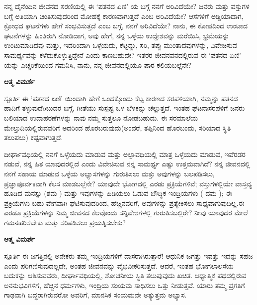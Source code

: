 \newpage
\begin{mananam}{}
\small \mananatext ನನ್ನ ದೈನೆಂದಿನ ಜೀವನದ ಸರಣಿಯಲ್ಲಿ ಈ ‘ಪತನದ ಏಣಿ’ ಯ  ಬಗ್ಗೆ ನನಗೆ ಅರಿವಿದೆಯೇ? ಜನರು ಮತ್ತು ವಸ್ತುಗಳ ಬಗ್ಗೆ ಅತಿಯಾಗಿ ಚಿಂತಿಸುವುದರಿಂದ ಮೋಹಕ್ಕೆ ಕಾರಣವಾಗುತ್ತದೆ ಎಂಬ ಅರಿವಿದೆಯೇ? ಆಸೆಗಳಿಗೆ  ಅಡ್ಡಿಯಾದಾಗ, ಕ್ರೋಧದ ಘಟನೆಗಳು ಹೇಗೆ ಸಂಭವಿಸುತ್ತದೆ ಎಂಬ ಬಗ್ಗೆ, ನನಗೆ ಅರಿವಿದೆಯೇ? ನಾನು, ಈ ಕೋಪದಿಂದ ಉಂಟಾದ ಘಟನೆಗಳನ್ನು ಹಿಂತಿರುಗಿ ನೋಡಿದಾಗ,  ಅವು ಹೇಗೆ, ನನ್ನ ಒಳ್ಳೆಯ ಉದ್ದೇಶವನ್ನು ಮರೆಯಿಸಿ,  ಭ್ರಮೆಯನ್ನು ಉಂಟುಮಾಡಿದವು ಮತ್ತು,  ಇದರಿಂದಾಗಿ ಒಳ್ಳೆಯದು, ಕೆಟ್ಟದ್ದು, ಸರಿ, ತಪ್ಪು ಮುಂತಾದವುಗಳನ್ನು, ವಿವೇಚಿಸುವ ಸಾಮರ್ಥ್ಯವನ್ನು ಕಳೆದುಕೊಳ್ಳುತ್ತಿದ್ದೇನೆ ಎಂದು ಕಾಣಬಹುದೇ?  ಇತರರ ಜೀವನವನದಲ್ಲಿರುವ ಈ ‘ಪತನದ ಏಣಿ’ ಯನ್ನು ಎಚ್ಚರಿಕೆಯಿಂದ ಗಮನಿಸಿ, ನಾನು, ನನ್ನ ಜೀವನದಲ್ಲಿಯೂ ಪಾಠ ಕಲಿಯಬಲ್ಲೆನೇ?
\end{mananam}
\WritingHand\enspace\textbf{ಆತ್ಮ ವಿಮರ್ಶೆ}
\begin{inspiration}{\mananamfont ಸ್ಪೂರ್ತಿ}
\small \mananatext ಈ ‘ಪತನದ ಏಣಿ’ ಯಿಂದಾಗಿ ಹೇಗೆ ಒಂದಕ್ಕೊಂದು ಕೆಟ್ಟ ಕಾರಣದ ಸರಪಳಿಯಾಗಿ, ನಮ್ಮನ್ನು ಪತನದ ಹಾದಿಗೆ ತಳ್ಳುವುದೆoಬುದರ ಬಗ್ಗೆ, ಗೀತೆಯು ಸುಸ್ಪಷ್ಟ ಒಳ ಬೆಳಕನ್ನು ಚೆಲ್ಲುತ್ತದೆ. ಇಂತಹ ಘಟನಾಸರಪಳಿಗೆ  ಜನರು ಬಲಿಯಾದ ಉದಾಹರಣೆಗಳನ್ನು ನಾವು ನಮ್ಮ ಸುತ್ತಲೂ ನೋಡಬಹುದು. ಈ ಸರಮಾಲೆಯ ಮೇಲ್ತುದಿಯಲ್ಲಿರುವವರಿಗೆ ಅದರಿಂದ ಹೊರಬರುವುದು(ಅಂದರೆ, ತಪ್ಪಿನಿಂದ ಹೊರಬಂದು, ಸರಿಯಾದ ಸ್ಥಿತಿ ತಲುಪಲು) ಕಷ್ಟವಾಗುತ್ತದೆ. 
\end{inspiration}
\newpage

\begin{mananam}{}
\small \mananatext ದೀರ್ಘಾವಧಿಯಲ್ಲಿ ನನಗೆ ಒಳ್ಳೆಯದು ಮಾಡುವ ಮತ್ತು ಅಲ್ಪಾವಧಿಯಲ್ಲಿ ಮಾತ್ರ ಒಳ್ಳೆಯದು ಮಾಡುವ,  ಇವೆರಡರ ನಡುವೆ, ನನ್ನ ಹಿತ ಯಾವುದರಲ್ಲಿದೆ ಎಂದು ವಿವೇಚಿಸುವ ನನ್ನ ಸಾಮರ್ಥ್ಯ ಎಷ್ಟು ಉತ್ತಮವಾಗಿದೆ? ನನ್ನ ಜೀವನದಲ್ಲಿ ನನಗೆ ಸಹಾಯ ಮಾಡುವ ಒಳ್ಳೆಯ ಅಭ್ಯಾಸಗಳನ್ನು ಗುರುತಿಸಲು ಮತ್ತು ಅವುಗಳನ್ನು ಬಲಪಡಿಸಲು,  ಪ್ರಜ್ಞಾಪೂರ್ವಕವಾಗಿ ಕೆಲಸ ಮಾಡಬಲ್ಲೆನೇ? 
 ಯಾವುದೇ ಭೋಗದಲ್ಲಿ ಎರಡು ಪ್ರಕ್ರಿಯೆಗಳಿವೆ; ವಸ್ತುಗಳಲ್ಲಿಯೇ ವಾಸ್ತವ್ಯ ಹೂಡಿದ  ಮನಸ್ಸು (ಶಮ ) ಮತ್ತು ಇವುಗಳನ್ನು ಹಿಡಿಯಲು ಓಡುವ  ಬೌದ್ಧಿಕ ಇಂದ್ರಿಯಗಳು ( ದಮ ); ಈ ಪ್ರಕ್ರಿಯೆಗಳು ಬಹು ವೇಗವಾಗಿ ಘಟಿಸುವುದರಿಂದ, ಹೆಚ್ಚಿನವರಿಗೆ, ಅವುಗಳನ್ನು ಪ್ರತ್ಯೇಕಿಸಲು ಸಾಧ್ಯವಾಗುವುದಿಲ್ಲ.ಈ ಎರಡೂ ಪ್ರಕ್ರಿಯೆಗಳನ್ನು ನಿಮ್ಮ ಜೀವನದ ಕೆಲವೊಂದು ಸನ್ನಿವೇಶಗಳಲ್ಲಿ ಗುರುತಿಸಬಲ್ಲಿರೇ? ನೀವು ಯಾವುದರ ಮೇಲೆ ಗಮನಹರಿಸಬೇಕು ಮತ್ತು ಸರಿಪಡಿಸಲು ಪ್ರಯತ್ನಿಸಬೇಕು?
\end{mananam}
\WritingHand\enspace\textbf{ಆತ್ಮ ವಿಮರ್ಶೆ}
\begin{inspiration}{\mananamfont ಸ್ಪೂರ್ತಿ}
\small \mananatext ಈ ಜಗತ್ತಿನಲ್ಲಿ ಅನೇಕರು ತಮ್ಮ ಇಂದ್ರಿಯಗಳಿಗೆ ದಾಸರಾಗಿರುತ್ತಾರೆ! ಆಧುನಿಕ ಜಗತ್ತು ಇವತ್ತು ಇದನ್ನು ಸಹಜ ಎಂದು ಪರಿಗಣಿಸುವುದಲ್ಲದೇ, ಅಂತಹ ಜೀವನವನ್ನು ವೈಭವೀಕರಿಸುತ್ತದೆ. ಆದರೆ, ಇಂತಹ ಭೋಗಲಾಲಸೆಯ ಬದುಕನ್ನು ಆಶಿಸುವವರು, ದೀರ್ಘಾವಧಿಯಲ್ಲಿ, ಶೋಚನೀಯ ಸ್ಥಿತಿ ತಲುಪುವುದು ಖಚಿತ. ಆಧ್ಯಾತ್ಮಿಕ ಪಥದಲ್ಲಿರುವ ಅನನುಭವಿಗಳಿಗೆ, ಹೆಚ್ಚಿನ ಧರ್ಮಗಳು, ಇಂದ್ರಿಯ ಸಂಯಮ ಸಾಧಿಸಲು ಒತ್ತು ನೀಡುತ್ತವೆ. ಯಾರು ತಮ್ಮ ಪ್ರಗತಿಗೆ ಗಾಢವಾಗಿ ಬದ್ಧರಾಗಿರುವರೋ ಅವರಿಗೆ, ಮಾನಸಿಕ ಸಂಯಮವೇ ಅತ್ಯುತ್ತಮ ಅಭ್ಯಾಸ.
\end{inspiration}
\newpage

